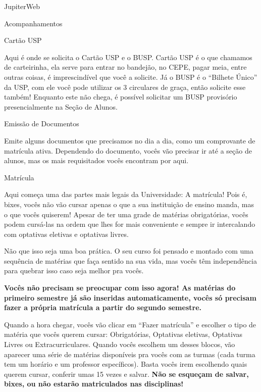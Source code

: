 \begin{secao}{JupiterWeb}
\begin{subsecao}{Acompanhamentos}
\begin{itemize}
\end{itemize}

\end{subsecao}

\begin{subsecao}{Cartão USP}

Aqui é onde se solicita o Cartão USP e o BUSP. Cartão USP é o que chamamos de
carteirinha, ela serve para entrar no bandejão, no CEPE, pagar meia, entre outras
coisas, é imprescindível que você a solicite. Já o BUSP é o ``Bilhete Único'' da USP,
com ele você pode utilizar os 3 circulares de graça, então solicite esse também!
Enquanto este não chega, é possível solicitar um BUSP provisório presencialmente na 
Seção de Alunos.

\end{subsecao}

\begin{subsecao}{Emissão de Documentos}

Emite alguns documentos que precisamos no dia a dia, como um comprovante de
matrícula ativa. Dependendo do documento, vocês vão precisar ir até a seção de
alunos, mas os mais requisitados vocês encontram por aqui.

\end{subsecao}

\begin{subsecao}{Matrícula}

Aqui começa uma das partes mais legais da Universidade: A matrícula! Pois é,
bixes, vocês não vão cursar apenas o que a sua instituição de ensino manda, mas o
que vocês quiserem! Apesar de ter uma grade de matérias obrigatórias, vocês
podem cursá-las na ordem que lhes for mais conveniente e sempre ir intercalando
com optativas eletivas e optativas livres.

Não que isso seja uma boa prática. O seu curso foi pensado e montado com uma
sequência de matérias que faça sentido na sua vida, mas vocês têm independência
para quebrar isso caso seja melhor pra vocês.

\textbf{Vocês não precisam se preocupar com isso agora! As matérias do primeiro
semestre já são inseridas automaticamente, vocês só precisam fazer a própria
matrícula a partir do segundo semestre.}

Quando a hora chegar, vocês vão clicar em “Fazer matrícula” e escolher o tipo de
matéria que vocês querem cursar: Obrigatórias, Optativas eletivas, Optativas
Livres ou Extracurriculares. Quando vocês escolhem um desses blocos, vão
aparecer uma série de matérias disponíveis pra vocês com as turmas (cada turma
tem um horário e um professor específicos). Basta vocês irem escolhendo quais
querem cursar, conferir umas 15 vezes e salvar. \textbf{Não se esqueçam de salvar,
bixes, ou não estarão matriculados nas disciplinas!}


\end{subsecao}
\end{secao}
